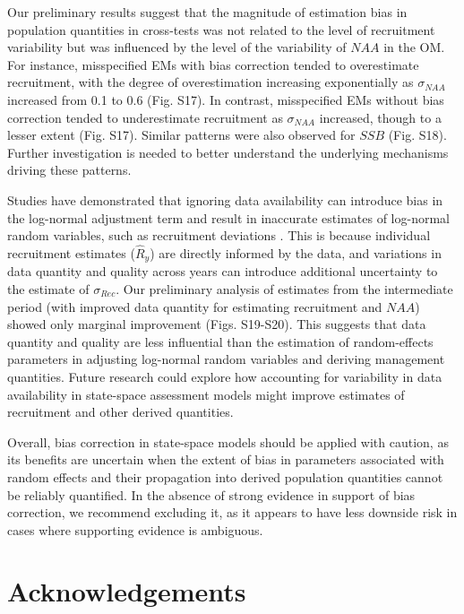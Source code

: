 \documentclass[
  12pt,
]{article}
\begin{document}
Our preliminary results suggest that the magnitude of estimation bias in
population quantities in cross-tests was not related to the level of
recruitment variability but was influenced by the level of the
variability of \(NAA\) in the OM. For instance, misspecified EMs with
bias correction tended to overestimate recruitment, with the degree of
overestimation increasing exponentially as \(\sigma_{NAA}\) increased
from 0.1 to 0.6 (Fig. S17). In contrast, misspecified EMs without bias
correction tended to underestimate recruitment as \(\sigma_{NAA}\)
increased, though to a lesser extent (Fig. S17). Similar patterns were
also observed for \(SSB\) (Fig. S18). Further investigation is needed to
better understand the underlying mechanisms driving these patterns.

Studies have demonstrated that ignoring data availability can introduce
bias in the log-normal adjustment term and result in inaccurate
estimates of log-normal random variables, such as recruitment deviations
\citep{Methot2011, Thorson2016}. This is because individual recruitment
estimates (\(\hat{R}_{y}\)) are directly informed by the data, and
variations in data quantity and quality across years can introduce
additional uncertainty to the estimate of \(\sigma_{Rec}\). Our
preliminary analysis of estimates from the intermediate period (with
improved data quantity for estimating recruitment and \(NAA\)) showed
only marginal improvement (Figs. S19-S20). This suggests that data
quantity and quality are less influential than the estimation of
random-effects parameters in adjusting log-normal random variables and
deriving management quantities. Future research could explore how
accounting for variability in data availability in state-space
assessment models might improve estimates of recruitment and other
derived quantities.

Overall, bias correction in state-space models should be applied with
caution, as its benefits are uncertain when the extent of bias in
parameters associated with random effects and their propagation into
derived population quantities cannot be reliably quantified. In the
absence of strong evidence in support of bias correction, we recommend
excluding it, as it appears to have less downside risk in cases where
supporting evidence is ambiguous.

\hypertarget{acknowledgements}{%
\section{Acknowledgements}\label{acknowledgements}}
\end{document}
